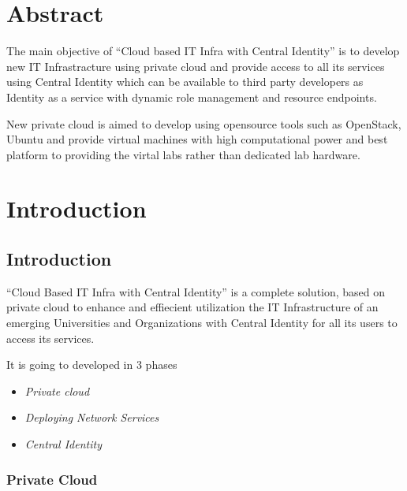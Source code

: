 \documentclass[12pt]{report}
\begin{document}
 
\chapter*{Abstract}
\setcounter{page}{1}
\normalsize
\hspace{0.5cm} The main objective of ``Cloud based IT Infra with Central Identity'' is to develop new IT Infrastracture using private cloud and provide access to all its services using 
Central Identity which can be available to third party developers  as Identity as a service with dynamic role management and resource endpoints. \newline

New private cloud is aimed to develop using opensource tools such as OpenStack, Ubuntu and provide  virtual machines with high computational power and best platform to providing the virtal labs rather than dedicated lab hardware.

\setcounter{page}{2}
\tableofcontents
\pagebreak \thispagestyle{empty} \pagebreak

 
\setcounter{page}{1}


\chapter{Introduction}

\section{Introduction}
	``Cloud Based IT Infra with Central Identity'' is a complete solution, based on private cloud to enhance and effiecient utilization the IT Infrastructure of an emerging Universities and Organizations with Central Identity for all its users to access its services.\newline

	It is going to developed in 3 phases 
	\begin{itemize}
		\item \textit{Private cloud} 
		\item \textit{Deploying Network Services} 
		\item \textit{Central Identity}
	\end{itemize}
	
\subsection{Private Cloud}
\end{document}
